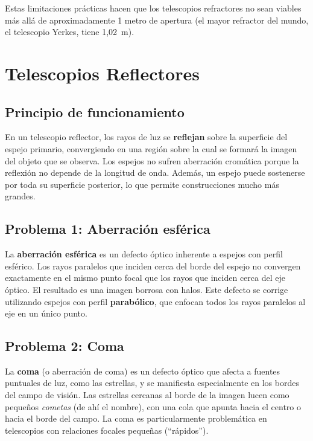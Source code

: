 Estas limitaciones prácticas hacen que los telescopios refractores no sean viables más allá de aproximadamente 1 metro de apertura (el mayor refractor del mundo, el telescopio Yerkes, tiene 1,02~m).

\section{Telescopios Reflectores}

\subsection{Principio de funcionamiento}

En un telescopio reflector, los rayos de luz se \textbf{reflejan} sobre la superficie del espejo primario, convergiendo en una región sobre la cual se formará la imagen del objeto que se observa. Los espejos no sufren aberración cromática porque la reflexión no depende de la longitud de onda. Además, un espejo puede sostenerse por toda su superficie posterior, lo que permite construcciones mucho más grandes.



\subsection{Problema 1: Aberración esférica}

La \textbf{aberración esférica} es un defecto óptico inherente a espejos con perfil esférico. Los rayos paralelos que inciden cerca del borde del espejo no convergen exactamente en el mismo punto focal que los rayos que inciden cerca del eje óptico. El resultado es una imagen borrosa con halos. Este defecto se corrige utilizando espejos con perfil \textbf{parabólico}, que enfocan todos los rayos paralelos al eje en un único punto.



\subsection{Problema 2: Coma}

La \textbf{coma} (o aberración de coma) es un defecto óptico que afecta a fuentes puntuales de luz, como las estrellas, y se manifiesta especialmente en los bordes del campo de visión. Las estrellas cercanas al borde de la imagen lucen como pequeños \textit{cometas} (de ahí el nombre), con una cola que apunta hacia el centro o hacia el borde del campo. La coma es particularmente problemática en telescopios con relaciones focales pequeñas (``rápidos'').


